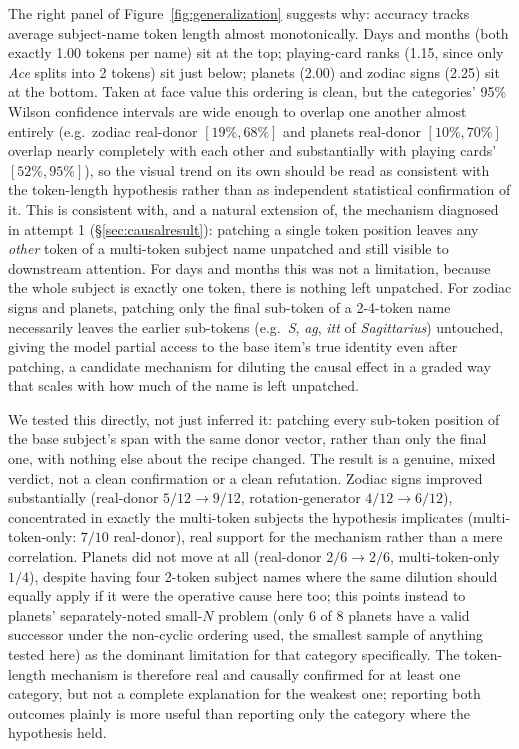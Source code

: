 \documentclass[11pt]{article}
\begin{document}
The right panel of Figure~\ref{fig:generalization} suggests why: accuracy
tracks average subject-name token length almost monotonically. Days and
months (both exactly 1.00 tokens per name) sit at the top; playing-card
ranks (1.15, since only \emph{Ace} splits into 2 tokens) sit just below;
planets (2.00) and zodiac signs (2.25) sit at the bottom. Taken at face
value this ordering is clean, but the categories' 95\% Wilson confidence
intervals are wide enough to overlap one another almost entirely (e.g.\
zodiac real-donor $[19\%, 68\%]$ and planets real-donor $[10\%, 70\%]$
overlap nearly completely with each other and substantially with playing
cards' $[52\%, 95\%]$), so the visual trend on its own should be read as
consistent with the token-length hypothesis rather than as independent
statistical confirmation of it. This is consistent with, and a natural
extension of, the mechanism diagnosed in attempt 1
(\S\ref{sec:causalresult}): patching a single token position leaves any
\emph{other} token of a multi-token subject name unpatched and still visible
to downstream attention. For days and months this was not a limitation,
because the whole subject is exactly one token, there is nothing left
unpatched. For zodiac signs and planets, patching only the final sub-token
of a 2-4-token name necessarily leaves the earlier sub-tokens (e.g.\
\emph{S}, \emph{ag}, \emph{itt} of \emph{Sagittarius}) untouched, giving the
model partial access to the base item's true identity even after patching,
a candidate mechanism for diluting the causal effect in a graded way that
scales with how much of the name is left unpatched.

We tested this directly, not just inferred it: patching every sub-token
position of the base subject's span with the same donor vector, rather
than only the final one, with nothing else about the recipe changed. The
result is a genuine, mixed verdict, not a clean confirmation or a clean
refutation. Zodiac signs improved substantially (real-donor $5/12\to
9/12$, rotation-generator $4/12\to 6/12$), concentrated in exactly the
multi-token subjects the hypothesis implicates (multi-token-only:
$7/10$ real-donor), real support for the mechanism rather than a mere
correlation. Planets did not move at all (real-donor $2/6\to 2/6$,
multi-token-only $1/4$), despite having four 2-token subject names where
the same dilution should equally apply if it were the operative cause
here too; this points instead to planets' separately-noted small-$N$
problem (only 6 of 8 planets have a valid successor under the
non-cyclic ordering used, the smallest sample of anything tested here)
as the dominant limitation for that category specifically. The
token-length mechanism is therefore real and causally confirmed for at
least one category, but not a complete explanation for the weakest one;
reporting both outcomes plainly is more useful than reporting only the
category where the hypothesis held.
\end{document}
